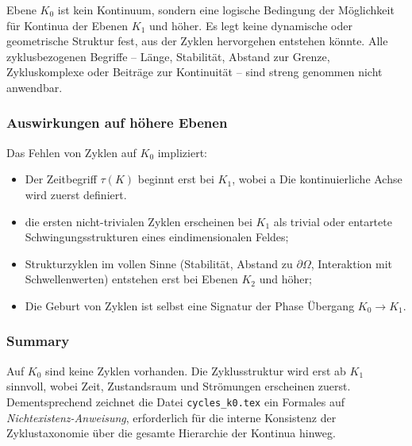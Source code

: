 Ebene $K_0$ ist kein Kontinuum, sondern eine logische Bedingung der Möglichkeit
für Kontinua der Ebenen $K_1$ und höher.
Es legt keine dynamische oder geometrische Struktur fest, aus der Zyklen hervorgehen
entstehen könnte.
Alle zyklusbezogenen Begriffe – Länge, Stabilität, Abstand zur Grenze,
Zykluskomplexe oder Beiträge zur Kontinuität – sind streng genommen
nicht anwendbar.

\subsubsection{Auswirkungen auf höhere Ebenen}

Das Fehlen von Zyklen auf $K_0$ impliziert:
\begin{itemize}
  \item Der Zeitbegriff $\tau(K)$ beginnt erst bei $K_1$, wobei a
        Die kontinuierliche Achse wird zuerst definiert.
  \item die ersten nicht-trivialen Zyklen erscheinen bei $K_1$ als trivial oder
        entartete Schwingungsstrukturen eines eindimensionalen Feldes;
  \item Strukturzyklen im vollen Sinne (Stabilität, Abstand zu
        $\partial\Omega$, Interaktion mit Schwellenwerten) entstehen erst bei
        Ebenen $K_2$ und höher;
  \item Die Geburt von Zyklen ist selbst eine Signatur der Phase
        Übergang $K_0\to K_1$.
\end{itemize}

\subsubsection{Summary}

Auf $K_0$ sind keine Zyklen vorhanden.
Die Zyklusstruktur wird erst ab $K_1$ sinnvoll, wobei Zeit,
Zustandsraum und Strömungen erscheinen zuerst.
Dementsprechend zeichnet die Datei \texttt{cycles\_k0.tex} ein Formales auf
\emph{Nichtexistenz-Anweisung}, erforderlich für die interne Konsistenz
der Zyklustaxonomie über die gesamte Hierarchie der Kontinua hinweg.
